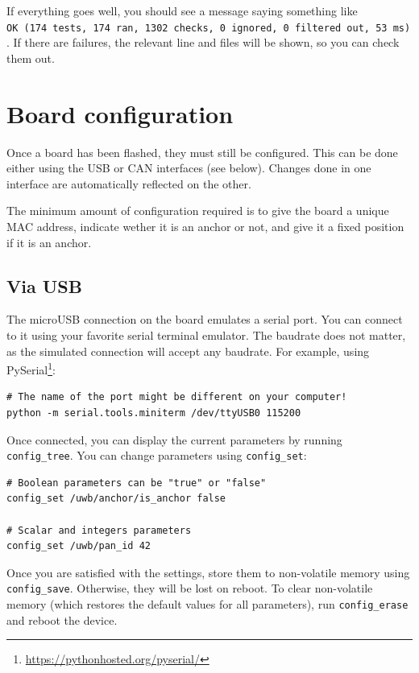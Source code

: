If everything goes well, you should see a message saying something like
\texttt{OK\ (174\ tests,\ 174\ ran,\ 1302\ checks,\ 0\ ignored,\ 0\ filtered\ out,\ 53\ ms)}.
If there are failures, the relevant line and files will be shown, so you
can check them out.

\section{Board configuration}\label{board-configuration}

Once a board has been flashed, they must still be configured. This can
be done either using the USB or CAN interfaces (see below). Changes done
in one interface are automatically reflected on the other.

The minimum amount of configuration required is to give the board a
unique MAC address, indicate wether it is an anchor or not, and give it
a fixed position if it is an anchor.

\subsection{Via USB}\label{via-usb}

The microUSB connection on the board emulates a serial port. You can
connect to it using your favorite serial terminal emulator. The baudrate
does not matter, as the simulated connection will accept any baudrate.
For example, using PySerial\footnote{\url{https://pythonhosted.org/pyserial/}}:

\begin{verbatim}
# The name of the port might be different on your computer!
python -m serial.tools.miniterm /dev/ttyUSB0 115200
\end{verbatim}

Once connected, you can display the current parameters by running
\texttt{config\_tree}. You can change parameters using
\texttt{config\_set}:

\begin{verbatim}
# Boolean parameters can be "true" or "false"
config_set /uwb/anchor/is_anchor false

# Scalar and integers parameters
config_set /uwb/pan_id 42
\end{verbatim}

Once you are satisfied with the settings, store them to non-volatile
memory using \texttt{config\_save}. Otherwise, they will be lost on
reboot. To clear non-volatile memory (which restores the default values
for all parameters), run \texttt{config\_erase} and reboot the device.

